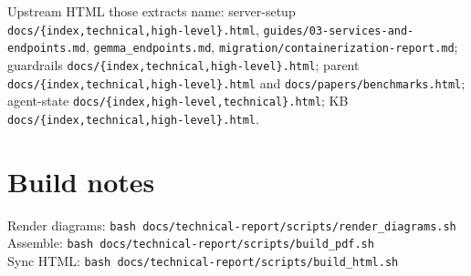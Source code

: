 Upstream HTML those extracts name: server-setup \texttt{docs/\{index,technical,high-level\}.html}, \texttt{guides/03-services-and-endpoints.md}, \texttt{gemma\_endpoints.md}, \texttt{migration/containerization-report.md}; guardrails \texttt{docs/\{index,technical,high-level\}.html}; parent \texttt{docs/\{index,technical,high-level\}.html} and \texttt{docs/papers/benchmarks.html}; agent-state \texttt{docs/\{index,high-level,technical\}.html}; KB \texttt{docs/\{index,technical,high-level\}.html}.

\section{Build notes}\label{build-notes}

Render diagrams: \texttt{bash\ docs/technical-report/scripts/render\_diagrams.sh}\\
Assemble: \texttt{bash\ docs/technical-report/scripts/build\_pdf.sh}\\
Sync HTML: \texttt{bash\ docs/technical-report/scripts/build\_html.sh}
